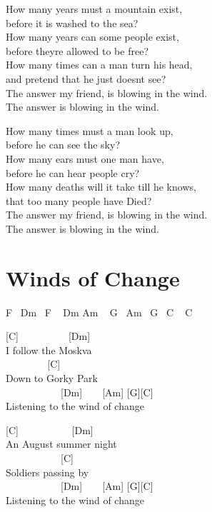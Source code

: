 \documentclass[
  letterpaper,
]{scrbook}
\begin{document}
How many years must a mountain exist,\\
before it is washed to the sea?\\
How many years can some people exist,\\
before they\textquotesingle re allowed to be free?\\
How many times can a man turn his head,\\
and pretend that he just doesn\textquotesingle t see?\\
The answer my friend, is blowing in the wind.\\
The answer is blowing in the wind.

How many times must a man look up,\\
before he can see the sky?\\
How many ears must one man have,\\
before he can hear people cry?\\
How many deaths will it take \textquotesingle till he knows,\\
that too many people have Died?\\
The answer my friend, is blowing in the wind.\\
The answer is blowing in the wind.

\hypertarget{winds-of-change}{%
\chapter{Winds of Change}\label{winds-of-change}}

F ~Dm ~F ~ Dm Am ~ G ~Am ~G ~C ~ C

{[}C{]} ~ ~ ~ ~ ~ ~{[}Dm{]}\\
I follow the Moskva\\
\hspace*{0.333em} ~ ~ ~ ~ ~ {[}C{]}\\
Down to Gorky Park\\
\hspace*{0.333em} ~ ~ ~ ~ ~ ~ ~{[}Dm{]} ~ ~ {[}Am{]} {[}G{]}{[}C{]}\\
Listening to the wind of change

{[}C{]} ~ ~ ~ ~ ~ ~ {[}Dm{]}\\
An August summer night\\
\hspace*{0.333em} ~ ~ ~ ~ ~ ~ ~{[}C{]}\\
Soldiers passing by\\
\hspace*{0.333em} ~ ~ ~ ~ ~ ~ ~{[}Dm{]} ~ ~ {[}Am{]} {[}G{]}{[}C{]}\\
Listening to the wind of change
\end{document}
